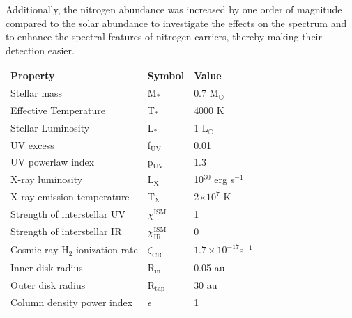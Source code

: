 \documentclass[oneside, single, authoryear, semicolon, 12pt]{lion-msc}
\newcommand{\4}{$_4$}
\newcommand{\3}{$_3$}
\newcommand{\2}{$_2$}
\begin{document}
Additionally, the nitrogen abundance was increased by one order of magnitude compared to the solar abundance to investigate the effects on the spectrum and to enhance the spectral features of nitrogen carriers, thereby making their detection easier.

\begin{table}[H]
\centering
\begin{tabular}{@{}lll@{}}
                                  &                             &                            \\ \hline\midrule
\textbf{Property}                 & \textbf{Symbol}             & \textbf{Value}             \\ \midrule
Stellar mass                      & M$_\ast$                    & 0.7 M$_\odot$               \\
Effective Temperature             & T$_\ast$                    & 4000 K                     \\
Stellar Luminosity                & L$_\ast$                    & 1 L$_\odot$                \\
UV excess                         & f$_{\mathrm{UV}}$                    & 0.01                       \\
UV powerlaw index                 & p$_{\mathrm{UV}}$                    & 1.3                        \\
X-ray luminosity                  & L$_\mathrm{X}$                       & 10$^{30}$ erg s$^{-1}$              \\
X-ray emission temperature        & T$_\mathrm{X}$                       & 2$\times10^7$ K            \\ \midrule
Strength of interstellar UV       & $\chi^{\mathrm{ISM}}$                & 1                          \\
Strength of interstellar IR       & $\chi^{\mathrm{ISM}}_{\mathrm{IR}}$           & 0                          \\
Cosmic ray H$_2$ ionization rate  & $\zeta_{\mathrm{CR}}$                & $1.7\times10^{-17}$s$ ^{-1}$ \\ \midrule
Inner disk radius                 & R$_{\mathrm{in}}$                    & 0.05 au                    \\
Outer disk radius                 & R$_{\mathrm{tap}}$                   & 30 au                      \\
Column density power index        & $\epsilon$                  & 1                          \\

\end{tabular}
\end{table}
\end{document}

